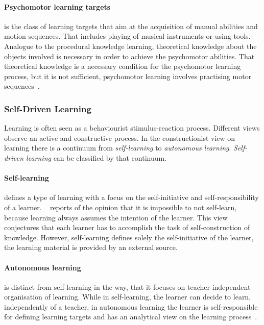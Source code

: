 \paragraph{Psychomotor learning targets} is the class of learning targets that aim 
at the acquisition of manual abilities and motion sequences. That includes 
playing of musical instruments or using tools. Analogue to the procedural 
knowledge learning, theoretical knowledge about the objects involved is necessary
in order to achieve the psychomotor abilities. That theoretical knowledge is
a necessary condition for the psychomotor learning process, but it is not
sufficient, psychomotor learning involves practising motor 
sequences~.

\subsubsection{Self-Driven Learning}
\label{sec:elearn:selfdrivenlearning}

Learning is often seen as a behaviourist stimulus-reaction process. Different 
views observe an active and constructive process. In the constructionist
view on learning there is a continuum from \emph{self-learning} to
\emph{autonomous learning}. \emph{Self-driven learning} can be classified
by that continuum.

\paragraph{Self-learning} defines a type of learning with a focus on the 
self-initiative and self-responsibility of a learner. 
~\citeyear{Richert2007} reports of the
opinion that it is impossible to not self-learn, because learning always
assumes the intention of the learner. This view conjectures that each learner 
has to accomplish the task of self-construction of knowledge. However,
self-learning defines solely the self-initiative of the learner, the learning
material is provided by an external source.

\paragraph{Autonomous learning} is distinct from self-learning in the way,
that it focuses on teacher-independent organisation of learning. 
While in self-learning, the learner can decide to learn, independently
of a teacher, in autonomous learning the learner is self-responsible 
for defining learning targets and has an analytical view on the 
learning process~.

